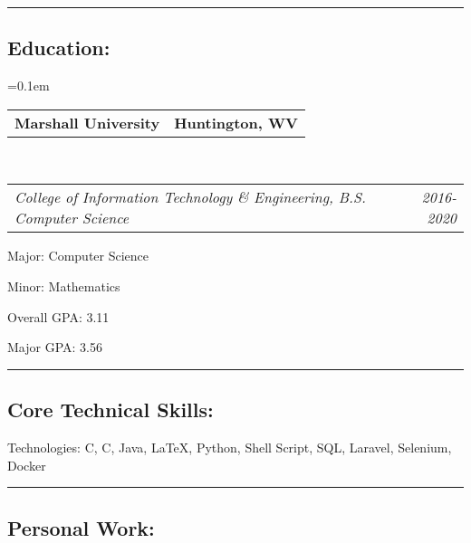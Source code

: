 \documentclass[10pt,letterpaper]{article}
\makeatletter
\newenvironment{indentsection}[1]%
{\begin{list}{}%
	{\setlength{\leftmargin}{#1}}%
	\item[]%
}
{\end{list}}
\newcommand{\headerrow}[2]
{\begin{tabular*}{\linewidth}{l@{\extracolsep{\fill}}r}
	#1 &
	#2 \\
\end{tabular*}}
\newcommand{\CPP}
{C\nolinebreak[4]\hspace{-.05em}\raisebox{.22ex}{\footnotesize\bf ++}}
\makeatother
\begin{document}


\hrule
\vspace{-0.4em}
\subsection*{\Large{Education:}}

	\parskip=0.1em

	\headerrow
		{\textbf{Marshall University}}
		{\textbf{Huntington, WV}}
	\\
	\headerrow
		{\emph{College of Information Technology \& Engineering, B.S. Computer Science}}
		{\emph{2016-2020}}
	\begin{itemize*}
		\item Major: Computer Science
		\item Minor: Mathematics
		\item Overall GPA: 3.11
		\item Major GPA: 3.56
	\end{itemize*}



\hrule
\vspace{-0.4em}
\subsection*{\Large{Core Technical Skills:}}

\begin{indentsection}{\parindent}
\begin{description*}
	\item[Technologies:]
	C, \CPP, Java, \LaTeX, Python, Shell Script, SQL, Laravel, Selenium, Docker
\end{description*}
\end{indentsection}

\hrule
\vspace{-0.4em}
\subsection*{\Large{Personal Work:}}
\end{document}
